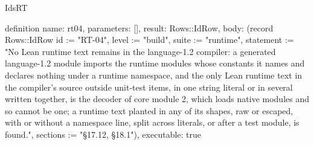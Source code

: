 \begin{lexlean}{IdsRT}
\begin{semanticmodule}
definition{
  name: rt04,
  parameters: [],
  result: Rows::IdRow,
  body: (record Rows::IdRow {id := "RT-04", level := "build", suite := "runtime", statement := "No Lean runtime text remains in the language-1.2 compiler: a generated language-1.2 module imports the runtime modules whose constants it names and declares nothing under a runtime namespace, and the only Lean runtime text in the compiler's source outside unit-test items, in one string literal or in several written together, is the decoder of core module 2, which loads native modules and so cannot be one; a runtime text planted in any of its shapes, raw or escaped, with or without a namespace line, split across literals, or after a test module, is found.", sections := "§17.12, §18.1"}),
  executable: true
}
\end{semanticmodule}
\end{lexlean}
